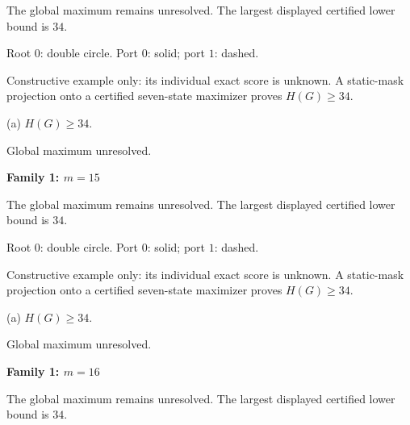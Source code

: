 \documentclass[10pt,a4paper]{article}
\begin{document}
\vspace{2mm}
{\small The global maximum remains unresolved. The largest displayed certified lower bound is $34$.}\par
\vspace{1mm}
{\small Root $0$: double circle. Port $0$: solid; port $1$: dashed.}\par
\vspace{3mm}
{\small Constructive example only: its individual exact score is unknown. A static-mask projection onto a certified seven-state maximizer proves $H(G)\ge34$.}\par\vspace{2mm}
\noindent\hfill
\begin{minipage}[t]{.96\textwidth}\centering
\resizebox{14cm}{!}{}\par
{\footnotesize (a) $H(G)\ge 34$.\par Global maximum unresolved.}\par
\end{minipage}\hfill
\par\vspace{2.5mm}
\clearpage
{\Large\bfseries Family 1: $m=15$}\par
\vspace{2mm}
{\small The global maximum remains unresolved. The largest displayed certified lower bound is $34$.}\par
\vspace{1mm}
{\small Root $0$: double circle. Port $0$: solid; port $1$: dashed.}\par
\vspace{3mm}
{\small Constructive example only: its individual exact score is unknown. A static-mask projection onto a certified seven-state maximizer proves $H(G)\ge34$.}\par\vspace{2mm}
\noindent\hfill
\begin{minipage}[t]{.96\textwidth}\centering
\resizebox{14cm}{!}{}\par
{\footnotesize (a) $H(G)\ge 34$.\par Global maximum unresolved.}\par
\end{minipage}\hfill
\par\vspace{2.5mm}
\clearpage
{\Large\bfseries Family 1: $m=16$}\par
\vspace{2mm}
{\small The global maximum remains unresolved. The largest displayed certified lower bound is $34$.}\par
\end{document}
